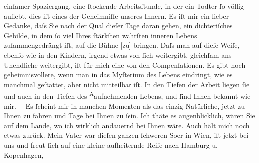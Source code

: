 \begin{ledgroupsized}[t]{13cm}
               einſamer Spaziergang, eine ſtockende Arbeitsſtunde, in der ein Todter ſo völlig
               auflebt, dies iſt eines der Geheimniſſe unseres Innern.\pend
           \pstart
           Es iſt mir ein lieber Gedanke, daſs Sie nach der Qual dieſer Tage daran {\pb}gehen, ein dichteriſches Gebilde, in dem ſo viel Ihres ſtärkſten
               wahrſten inneren Lebens zuſammengedrängt iſt, auf die Bühne {[}zu{]}
               bringen. Daſs man auf dieſe Weiſe, ebenſo wie in den Kindern, irgend etwas von ſich
               weitergibt, gleichſam ans Unendliche weitergibt, iſt für mich eine von den
               Compenſationen. Es gibt noch geheimnisvollere, wenn man in das Myſterium des Lebens
               eindringt, wie es manchmal geſtattet, aber {\pb}nicht mitteilbar iſt. In den
               Tiefen der Arbeit liegen ſie und auch in den Tiefen des \substVorne{}\textsuperscript{A}\substDazwischen{}a\substHinten{}ufnehmenden Lebens, und ſind Ihnen bekannt wie mir. – Es ſcheint mir in
               manchen Momenten als das einzig Natürliche, jetzt zu Ihnen zu fahren und Tage bei
               Ihnen zu ſein. Ich thäte es augenblicklich, wären Sie auf dem Lande, wo ich wirklich
               andauernd bei Ihnen wäre.\pend
           \pstart
           Auch hält mich noch etwas zurück. Mein Vater war dieſen ganzen ſchweren So{\geminationm}er in Wien,
               iſt jetzt bei uns und freut ſich auf eine kleine aufheiternde Reiſe nach Hamburg u. Kopenhagen, \label{T_L02027_1v}
\end{ledgroupsized}
